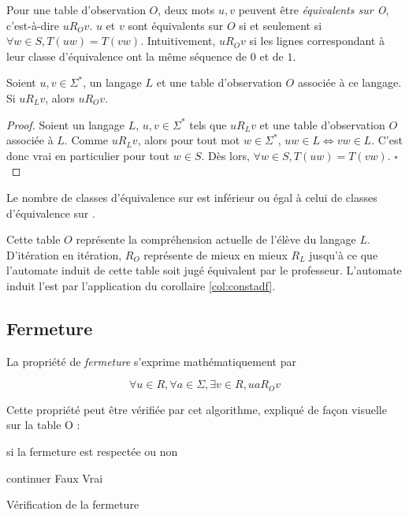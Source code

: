 	Pour une table d'observation $O$, deux mots $u,v$ peuvent être \emph{équivalents sur O}, c'est-à-dire $uR_Ov$. $u$ et $v$ sont équivalents sur $O$ si et seulement si $\forall w \in S, T(uw)=T(vw)$. Intuitivement, $uR_Ov$ si les lignes correspondant à leur classe d'équivalence ont la même séquence de $0$ et de $1$.

	\begin{proposition}
		Soient $u,v \in \Sigma^*$, un langage $L$ et une table d'observation $O$ associée à ce langage. Si $uR_Lv$, alors $uR_Ov$.
	\end{proposition}

	\begin{proof}
		Soient un langage $L$, $u,v \in \Sigma^*$ tels que $uR_Lv$ et une table d'observation $O$ associée à $L$.
		Comme $uR_Lv$, alors pour tout mot $w\in\Sigma^*$, $uw\in L \iff vw\in L$. C'est donc vrai en particulier pour tout $w\in S$. Dès lors, $\forall w \in S, T(uw)=T(vw)$.
		\hfill$\square$
	\end{proof}

	\begin{corollary}
		Le nombre de classes d'équivalence sur \ro est inférieur ou égal à celui de classes d'équivalence sur \rl.
	\end{corollary}

	Cette table $O$ représente la compréhension actuelle de l'élève du langage $L$. D'itération en itération, $R_O$ représente de mieux en mieux $R_L$ jusqu'à ce que l'automate induit de cette table soit jugé équivalent par le professeur. L'automate induit l'est par l'application du corollaire \ref{col:constadf}.


\subsection{Fermeture}\label{angluin:ferm}
La propriété de \emph{fermeture} s'exprime mathématiquement par

$$ \forall u \in R, \forall a \in \Sigma, \exists v \in R, ua R_O v$$

Cette propriété peut être vérifiée par cet algorithme, expliqué de façon visuelle sur la table O :

\begin{algorithm}[H]
	\begin{algorithmic}[1]
		\ENSURE si la fermeture est respectée ou non

				\STATE continuer
			\ELSE
				\STATE {}
					\RETURN Faux
				\ENDIF
			\ENDIF
		\ENDFOR
		\ENDFOR
		\RETURN Vrai
	\end{algorithmic}
	\caption{Vérification de la fermeture}\label{alg:fermeture}
\end{algorithm}

